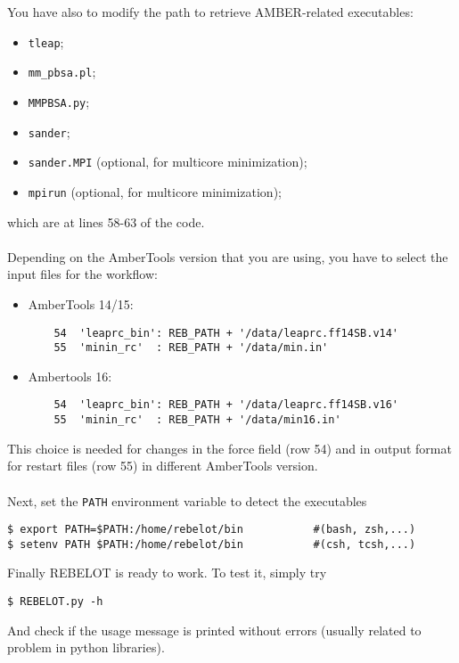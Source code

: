 \documentclass[a4paper,12pt]{book}
\begin{document}
You have also to modify the path to retrieve AMBER-related executables:
\begin{itemize}
	\item \texttt{tleap};
	\item \texttt{mm\_pbsa.pl};
	\item \texttt{MMPBSA.py};
	\item \texttt{sander}; 
	\item \texttt{sander.MPI} (optional, for multicore minimization);
	\item \texttt{mpirun} (optional, for multicore minimization);
\end{itemize}
which are at lines 58-63 of the code. \\ \\
Depending on the AmberTools version that you are using, you have to select the input files for the workflow:
\begin{itemize}
	\item AmberTools 14/15:
	\begin{lstlisting}
	54	'leaprc_bin': REB_PATH + '/data/leaprc.ff14SB.v14'
	55	'minin_rc'	: REB_PATH + '/data/min.in'
	\end{lstlisting}
	\item Ambertools 16:
	\begin{lstlisting}
	54	'leaprc_bin': REB_PATH + '/data/leaprc.ff14SB.v16'
	55	'minin_rc'	: REB_PATH + '/data/min16.in'
	\end{lstlisting}
\end{itemize}
This choice is needed for changes in the force field (row 54) and in output format for restart files (row 55) in different AmberTools version. \\ \\ 
Next, set the \texttt{PATH} environment variable to detect the executables
\begin{lstlisting}
$ export PATH=$PATH:/home/rebelot/bin			#(bash, zsh,...)
$ setenv PATH $PATH:/home/rebelot/bin			#(csh, tcsh,...)
\end{lstlisting}
Finally REBELOT is ready to work. To test it, simply try
\begin{lstlisting}
$ REBELOT.py -h
\end{lstlisting}
And check if the usage message is printed without errors (usually related to problem in python libraries).
\end{document}
